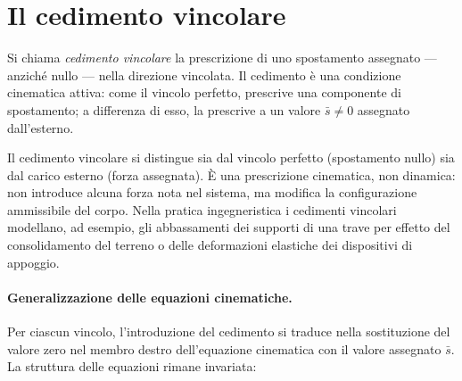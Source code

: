 \section{Il cedimento vincolare}\label{sec:cedimento}

\begin{definizione}\label{def:cedimento}
	Si chiama \emph{cedimento vincolare} la prescrizione di
	uno spostamento assegnato --- anziché nullo --- nella
	direzione vincolata. Il cedimento è una condizione
	cinematica attiva: come il vincolo perfetto, prescrive
	una componente di spostamento; a differenza di esso,
	la prescrive a un valore $\bar{s} \neq 0$ assegnato
	dall'esterno.
\end{definizione}

\begin{oss}
	Il cedimento vincolare si distingue sia dal vincolo
	perfetto (spostamento nullo) sia dal carico esterno
	(forza assegnata). È una prescrizione cinematica, non
	dinamica: non introduce alcuna forza nota nel sistema,
	ma modifica la configurazione ammissibile del corpo.
	Nella pratica ingegneristica i cedimenti vincolari
	modellano, ad esempio, gli abbassamenti dei supporti
	di una trave per effetto del consolidamento del terreno
	o delle deformazioni elastiche dei dispositivi di
	appoggio.
\end{oss}

\paragraph{Generalizzazione delle equazioni cinematiche.}
Per ciascun vincolo, l'introduzione del cedimento si traduce
nella sostituzione del valore zero nel membro destro
dell'equazione cinematica con il valore assegnato $\bar{s}$.
La struttura delle equazioni rimane invariata:

\medskip

